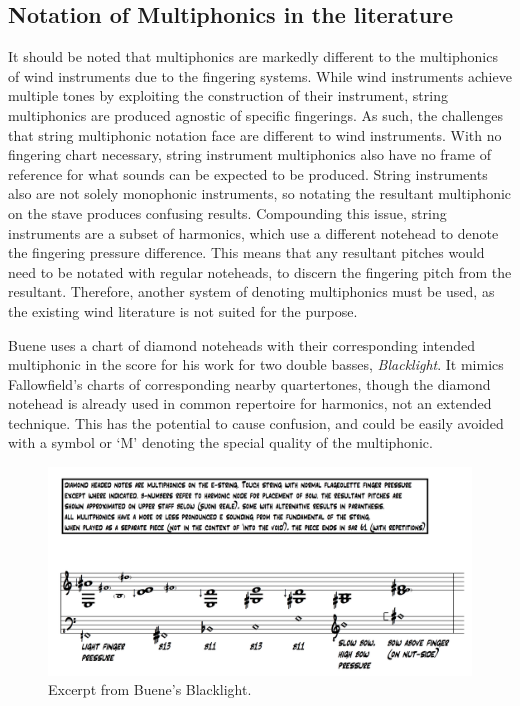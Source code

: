 \subsection{Notation of Multiphonics in the literature}

It should be noted that multiphonics are markedly different to the multiphonics of wind instruments due to the fingering systems.
While wind instruments achieve multiple tones by exploiting the construction of their instrument, string multiphonics are produced agnostic of specific fingerings.
As such, the challenges that string multiphonic notation face are different to wind instruments.
With no fingering chart necessary, string instrument multiphonics also have no frame of reference for what sounds can be expected to be produced.
String instruments also are not solely monophonic instruments, so notating the resultant multiphonic on the stave produces confusing results.
Compounding this issue, string instruments are a subset of harmonics, which use a different notehead to denote the fingering pressure difference.
This means that any resultant pitches would need to be notated with regular noteheads, to discern the fingering pitch from the resultant.
Therefore, another system of denoting multiphonics must be used, as the existing wind literature is not suited for the purpose.

Buene uses a chart of diamond noteheads with their corresponding intended multiphonic in the score for his work for two double basses, \emph{Blacklight}.\autocite[39-42]{thelinMultiphonicsDoubleBass2011}
It mimics Fallowfield's charts of corresponding nearby quartertones, though the diamond notehead is already used in common repertoire for harmonics, not an extended technique. 
This has the potential to cause confusion, and could be easily avoided with a symbol or `M' denoting the special quality of the multiphonic.

\begin{figure}
  \includegraphics[width=\linewidth]{./resources/bueneMultiphonicNotation.png}
  \caption{Excerpt from Buene's Blacklight.}
\label{fig:Excerpt from Buene's Blacklight}
\end{figure}

